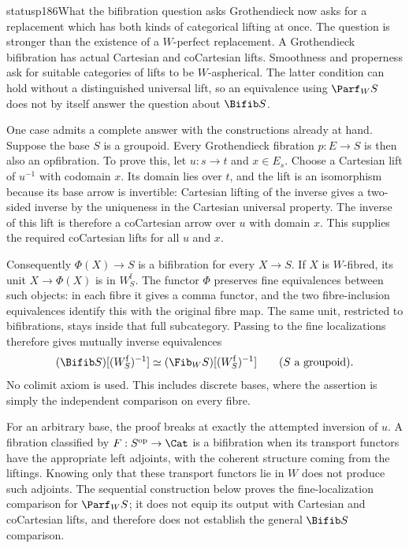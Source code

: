 \begin{dcomment}{status}{p186}{What the bifibration question asks}
Grothendieck now asks for a replacement which has both kinds of categorical lifting at once. The question is stronger than the existence of a $W$-perfect replacement. A Grothendieck bifibration has actual Cartesian and coCartesian lifts. Smoothness and properness ask for suitable categories of lifts to be $W$-aspherical. The latter condition can hold without a distinguished universal lift, so an equivalence using $\Parf_W S$ does not by itself answer the question about $\Bifib S$.

One case admits a complete answer with the constructions already at hand. Suppose the base $S$ is a groupoid. Every Grothendieck fibration $p:E\to S$ is then also an opfibration. To prove this, let $u:s\to t$ and $x\in E_s$. Choose a Cartesian lift of $u^{-1}$ with codomain $x$. Its domain lies over $t$, and the lift is an isomorphism because its base arrow is invertible: Cartesian lifting of the inverse gives a two-sided inverse by the uniqueness in the Cartesian universal property. The inverse of this lift is therefore a coCartesian arrow over $u$ with domain $x$. This supplies the required coCartesian lifts for all $u$ and $x$.

Consequently $\Phi(X)\to S$ is a bifibration for every $X\to S$. If $X$ is $W$-fibred, its unit $X\to\Phi(X)$ is in $W_S^{\mathrm f}$. The functor $\Phi$ preserves fine equivalences between such objects: in each fibre it gives a comma functor, and the two fibre-inclusion equivalences identify this with the original fibre map. The same unit, restricted to bifibrations, stays inside that full subcategory. Passing to the fine localizations therefore gives mutually inverse equivalences
\[
 (\Bifib S)[(W_S^{\mathrm f})^{-1}]
 \simeq (\Fib_W S)[(W_S^{\mathrm f})^{-1}]
 \qquad (S\text{ a groupoid}).
\]
No colimit axiom is used. This includes discrete bases, where the assertion is simply the independent comparison on every fibre.

For an arbitrary base, the proof breaks at exactly the attempted inversion of $u$. A fibration classified by $F:S^{\mathrm{op}}\to\Cat$ is a bifibration when its transport functors have the appropriate left adjoints, with the coherent structure coming from the liftings. Knowing only that these transport functors lie in $W$ does not produce such adjoints. The sequential construction below proves the fine-localization comparison for $\Parf_W S$; it does not equip its output with Cartesian and coCartesian lifts, and therefore does not establish the general $\Bifib S$ comparison.


\end{dcomment}
